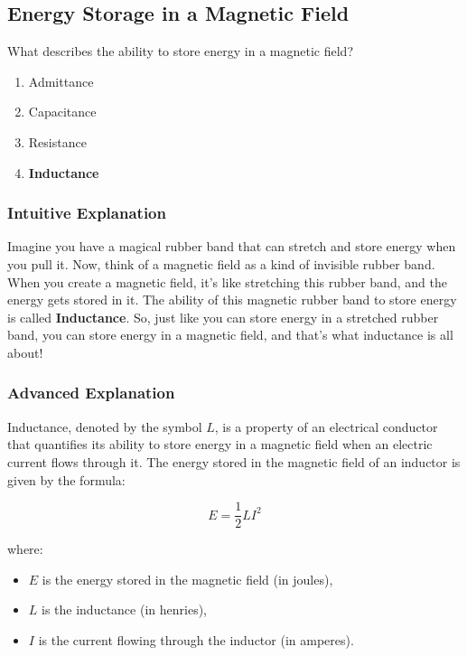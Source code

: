 \subsection{Energy Storage in a Magnetic Field}
\label{T5C03}

\begin{tcolorbox}[colback=gray!10!white,colframe=black!75!black,title=T5C03]
What describes the ability to store energy in a magnetic field?
\begin{enumerate}[label=\Alph*)]
    \item Admittance
    \item Capacitance
    \item Resistance
    \item \textbf{Inductance}
\end{enumerate}
\end{tcolorbox}

\subsubsection{Intuitive Explanation}
Imagine you have a magical rubber band that can stretch and store energy when you pull it. Now, think of a magnetic field as a kind of invisible rubber band. When you create a magnetic field, it’s like stretching this rubber band, and the energy gets stored in it. The ability of this magnetic rubber band to store energy is called \textbf{Inductance}. So, just like you can store energy in a stretched rubber band, you can store energy in a magnetic field, and that’s what inductance is all about!

\subsubsection{Advanced Explanation}
Inductance, denoted by the symbol \( L \), is a property of an electrical conductor that quantifies its ability to store energy in a magnetic field when an electric current flows through it. The energy stored in the magnetic field of an inductor is given by the formula:

\[
E = \frac{1}{2} L I^2
\]

where:
\begin{itemize}
    \item \( E \) is the energy stored in the magnetic field (in joules),
    \item \( L \) is the inductance (in henries),
    \item \( I \) is the current flowing through the inductor (in amperes).
\end{itemize}

